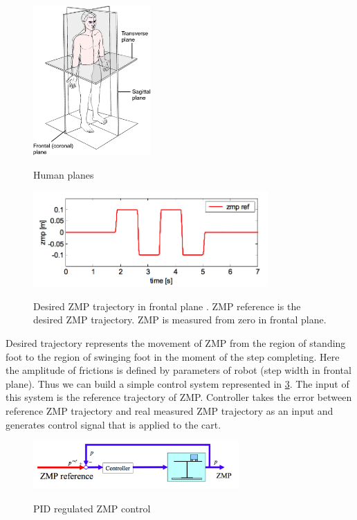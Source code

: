 \documentclass[12pt,a4paper]{report}
\begin{document}
			\begin{figure}[H]
				\vspace{-0.2cm}
				\centering
				{\includegraphics[width=0.4\textwidth]{7}}
				\caption{Human planes \cite{medical}}
				\label{fig:7}
				\vspace{-0.1cm}
			\end{figure}
			\begin{figure}[H]
				\vspace{-0.2cm}
				\centering
				{\includegraphics[width=0.8\textwidth]{8}}
				\caption{Desired ZMP trajectory in frontal plane \cite{kajita2003biped}. ZMP reference is the desired ZMP trajectory. ZMP is measured from zero in frontal plane.}
				\label{fig:8}
				\vspace{-0.1cm}
			\end{figure}
			Desired trajectory represents the movement of ZMP from the region of standing foot to the region of swinging foot in the moment of the step completing. Here the amplitude of frictions is defined by parameters of robot (step width in frontal plane). Thus we can build a simple control system represented in \cref{fig:9}. The input of this system is the reference trajectory of ZMP. Controller takes the error between reference ZMP trajectory and real measured ZMP trajectory as an input and generates control signal that is applied to the cart. 
			\begin{figure}[H]
				\vspace{-0.2cm}
				\centering
				{\includegraphics[width=0.7\textwidth]{9}}
				\caption{PID regulated ZMP control \cite{kajita2003biped}}
				\label{fig:9}
				\vspace{-0.1cm}
			\end{figure}
\end{document}
